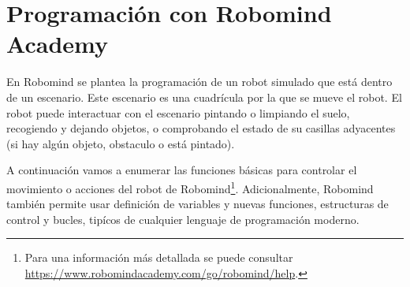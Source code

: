 \chapter{Programación con Robomind Academy}
\label{anexo:programacion-robomind}

En Robomind se plantea la programación de un robot simulado que está dentro de un escenario. Este escenario es una cuadrícula por la que se mueve el robot. El robot puede interactuar con el escenario pintando o limpiando el suelo, recogiendo y dejando objetos, o comprobando el estado de su casillas adyacentes (si hay algún objeto, obstaculo o está pintado).

A continuación vamos a enumerar las funciones básicas para controlar el movimiento o acciones del robot de Robomind\footnote{Para una información más detallada se puede consultar \url{https://www.robomindacademy.com/go/robomind/help}.}. Adicionalmente, Robomind también permite usar definición de variables y nuevas funciones, estructuras de control y bucles, tipícos de cualquier lenguaje de programación moderno.

